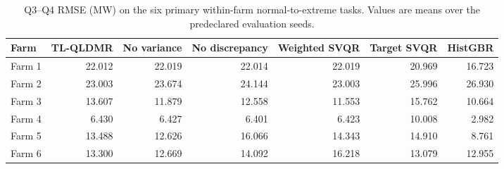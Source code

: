 \begin{table}[pos=t,width=\FullWidth]
\centering
\color{blue}
\caption{Q3--Q4 RMSE (MW) on the six primary within-farm normal-to-extreme tasks. Values are means over the predeclared evaluation seeds.}
\label{tab:selection-v2-primary-within}
\small
\setlength{\tabcolsep}{4pt}
\begin{tabular}{lrrrrrr}
\toprule
Farm & TL-QLDMR & No variance & No discrepancy & Weighted SVQR & Target SVQR & HistGBR \\
\midrule
Farm 1 & 22.012 & 22.019 & 22.014 & 22.019 & 20.969 & 16.723 \\
Farm 2 & 23.003 & 23.674 & 24.144 & 23.003 & 25.996 & 26.930 \\
Farm 3 & 13.607 & 11.879 & 12.558 & 11.553 & 15.762 & 10.664 \\
Farm 4 & 6.430 & 6.427 & 6.401 & 6.423 & 10.008 & 2.982 \\
Farm 5 & 13.488 & 12.626 & 16.066 & 14.343 & 14.910 & 8.761 \\
Farm 6 & 13.300 & 12.669 & 14.092 & 16.218 & 13.079 & 12.955 \\
\bottomrule
\end{tabular}
\end{table}
